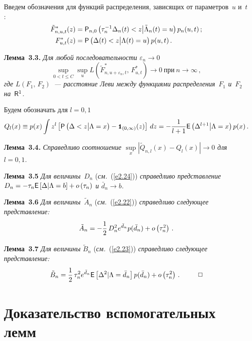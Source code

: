 Введем обозначения для функций распределения, зависящих от параметров~$u$ и~$t$:
\begin{align*}
\tilde F_{n,u,t}^{*}(z)&={{\sf P}}_{n,0}\left(\tau_n^{-1}\Delta_n(t) < z\big| \tilde\Lambda_n(t)=u\right)p_n(u,t)\,;
\\
F_{u,t}^{*}(z)&={{\sf P}}\left(\Delta(t) < z\big| \Lambda(t)=u\right)p(u,t)\,.
\end{align*}

\medskip

\noindent
\textbf{Лемма~3.3.} {\it  Для любой последовательности $\varepsilon_n\rightarrow 0$
$$
\sup\limits_{0<t\leq C}\sup\limits_{u}L\left( \tilde F_{n,u+\varepsilon_n,t}^{*},\,  
F_{u,t}^{*}\right)\longrightarrow 0\ \mbox{при}\  n\rightarrow\infty\,,
$$
где $L(F_1,\,F_2)$~--- расстояние Леви между функциями распределения~$F_1$ и~$F_2$ на~${\sf R}^1$. 
}

Будем обозначать для $l=0,1$
\begin{equation*}
Q_l(x)\equiv p(x)\int z^l\left[{{\sf P}}\left(\Delta < z\big| \Lambda=x\right)-{\mbox{{\small \tt {1}}\hspace{-1.5mm}{\tt 1}}}_{(0,\infty)}(z)\right]\,dz
=-\displaystyle\frac{\displaystyle 1\mathstrut}{\displaystyle l+1\mathstrut}{{\sf E}}\left(\Delta^{l+1}\big|\Lambda=x \right)p(x)\,.
\end{equation*}

\medskip

\noindent
\textbf{Лемма~3.4.} {\it  Справедливо соотношение $\sup\limits_{x} \left|\tilde Q_{n,l}(x)- Q_{l}(x) \right|\rightarrow 0$ 
для  $l=0,1$. 
}

\medskip

\noindent
\textbf{Лемма~3.5} {\it  Для величины~$D_n$} (\textit{см.}~(\ref{e2.24})) \textit{справедливо представление
$D_n=-\tau_n{{\sf E}}\left[\Delta\vert\Lambda=b \right]+ o\left(\tau_n\right)$
и $\bar d_n\rightarrow b$.
}

\medskip

\noindent
\textbf{Лемма~3.6} {\it Для величины~$\tilde A_n$} (\textit{см.}~(\ref{e2.22})) \textit{справедливо следующее представление:
$$
\tilde A_n=-\displaystyle\frac{\displaystyle 1\mathstrut}{\displaystyle 2\mathstrut}\,D_n^2e^{\bar d_n}p(\bar d_n)+ o\left(\tau_n^2\right)\,.
$$ }

\medskip

\noindent
\textbf{Лемма~3.7} {\it Для величины} $\tilde B_n$ (\textit{см.}~(\ref{e2.23})) \textit{справедливо следующее представление:
$$
\tilde B_n=\fr{1}{2}\,\tau_n^2 e^{\bar d_n}{\e}\left[\Delta^2\vert \Lambda=\bar d_n\right] p(\bar d_n)+ o\left(\tau_n^2\right)\,.\ \ \ \ \ \ \ \ \Box
$$ 
}


\section{Доказательство вспомогательных лемм}

